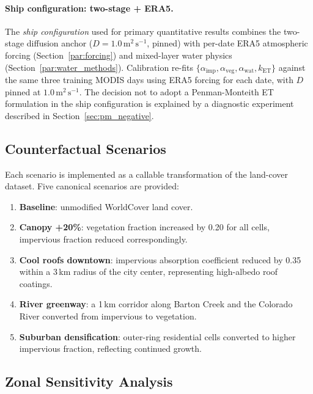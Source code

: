 \documentclass[12pt, letterpaper]{article}
\begin{document}
\paragraph{Ship configuration: two-stage + ERA5.}
\label{par:ship}
The \emph{ship configuration} used for primary quantitative results combines
the two-stage diffusion anchor ($D = 1.0\,\text{m}^2\,\text{s}^{-1}$,
pinned) with per-date ERA5 atmospheric forcing (Section~\ref{par:forcing})
and mixed-layer water physics (Section~\ref{par:water_methods}).
Calibration re-fits $\{\alpha_{\mathrm{imp}}, \alpha_{\mathrm{veg}},
\alpha_{\mathrm{wat}}, k_{\mathrm{ET}}\}$ against the same three training
MODIS days using ERA5 forcing for each date, with $D$ pinned at
$1.0\,\text{m}^2\,\text{s}^{-1}$. The decision not to adopt a
Penman-Monteith ET formulation in the ship configuration is explained by
a diagnostic experiment described in Section~\ref{sec:pm_negative}.

\subsection{Counterfactual Scenarios}

Each scenario is implemented as a callable transformation of the land-cover
dataset. Five canonical scenarios are provided:
\begin{enumerate}[noitemsep]
  \item \textbf{Baseline}: unmodified WorldCover land cover.
  \item \textbf{Canopy +20\%}: vegetation fraction increased by 0.20 for all
        cells, impervious fraction reduced correspondingly.
  \item \textbf{Cool roofs downtown}: impervious absorption coefficient
        reduced by 0.35 within a 3\,km radius of the city center, representing
        high-albedo roof coatings.
  \item \textbf{River greenway}: a 1\,km corridor along Barton Creek and
        the Colorado River converted from impervious to vegetation.
  \item \textbf{Suburban densification}: outer-ring residential cells
        converted to higher impervious fraction, reflecting continued growth.
\end{enumerate}

\subsection{Zonal Sensitivity Analysis}
\end{document}
